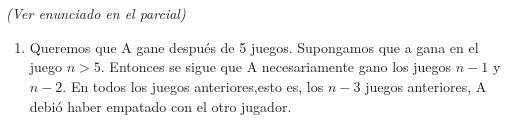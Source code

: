 \documentclass[11pt]{article}
\renewcommand{\(}{\left(}
\renewcommand{\)}{\right)}
\begin{document}
\section{}

\textit{(Ver enunciado en el parcial)}

\begin{enumerate}
	\item Queremos que A gane después de 5 juegos. Supongamos que a gana en el juego $n>5$. Entonces se sigue que A necesariamente gano los juegos $n-1$ y $n-2$. En todos los juegos anteriores,esto es, los $n-3$ juegos anteriores, A debió haber empatado con el otro jugador. 
\end{enumerate}
\end{document}
